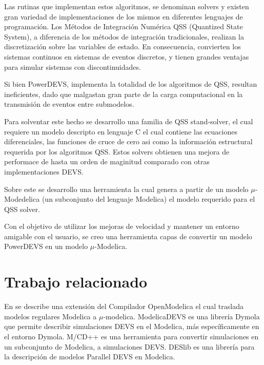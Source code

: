 \documentclass[a4paper,	11pt]{report}
\begin{document}
Las rutinas que implementan estos algoritmos, se denominan solvers y existen gran variedad de implementaciones de los mismos en diferentes lenguajes de programación. Los Métodos de Integración Numérica QSS (Quantized State System), a diferencia de los métodos de integración tradicionales, realizan la discretización sobre las variables de estado. En consecuencia, convierten los sistemas continuos en sistemas de eventos discretos, y tienen grandes ventajas para simular sistemas con discontinuidades.

Si bien PowerDEVS, implementa la totalidad de los algoritmos de QSS, resultan ineficientes, dado que malgastan gran parte de la carga computacional en la transmisión de eventos entre submodelos.

Para solventar este hecho se desarrollo una familia de QSS stand-solver, el cual requiere un modelo descripto en lenguaje C el cual contiene las ecuaciones diferenciales, las funciones de cruce de cero asi como la información estructural requerida por los algoritmos QSS. Estos solvers obtienen una mejora de performace de hasta un orden de maginitud comparado con otras implementaciones DEVS.

Sobre este se desarrollo una herramienta la cual genera a partir de un modelo $\mu$-Modedelica \cite{Ber12} (un subconjunto del lenguaje Modelica) el modelo requerido para el QSS solver.

Con el objetivo de utilizar los mejoras de velocidad y mantener un entorno amigable con el usuario, se creo una herramienta capas de convertir un modelo PowerDEVS en un modelo $\mu$-Modelica.


\section{Trabajo relacionado}
En \cite{Ber12} se describe una extensión del Compilador OpenModelica el cual traslada modelos regulares Modelica a $\mu$-modelica. 
ModelicaDEVS \cite{Beltrame06quantisedstate} es una librería Dymola que permite describir simulaciones DEVS en el Modelica, más específicamente en el entorno Dymola.
M/CD++ \cite{conf/mascots/DAbreuW05} es una herramienta para convertir simulaciones en un subconjunto de Modelica, a simulaciones DEVS.
DESlib \cite{Sanz09paralleldevs} es una librería para la descripción de modelos Parallel DEVS en Modelica.
\end{document}
